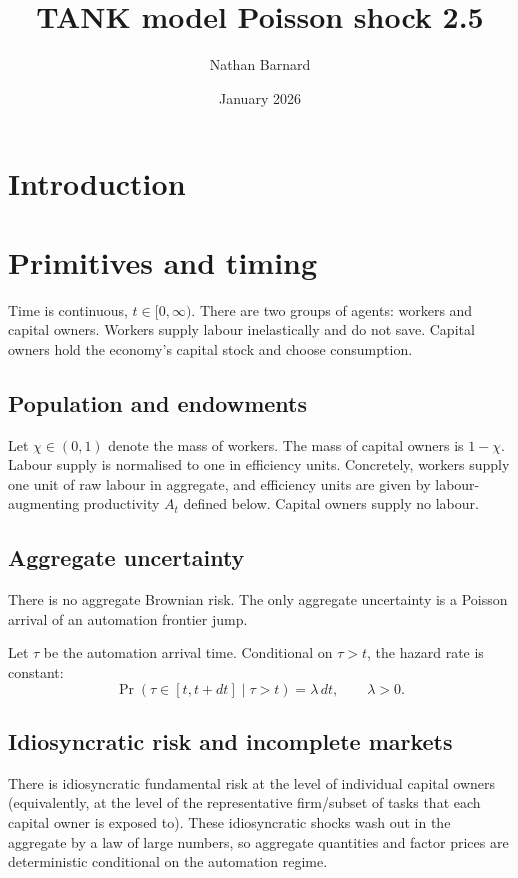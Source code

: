 \documentclass{article}
\title{TANK model Poisson shock 2.5}
\author{Nathan Barnard}
\date{January 2026}
\begin{document}
\maketitle

\section{Introduction}

\section{Primitives and timing}

Time is continuous, $t \in [0,\infty)$. There are two groups of agents: workers and capital owners. Workers supply labour inelastically and do not save. Capital owners hold the economy's capital stock and choose consumption.

\subsection{Population and endowments}

Let $\chi \in (0,1)$ denote the mass of workers. The mass of capital owners is $1-\chi$.
Labour supply is normalised to one in efficiency units. Concretely, workers supply one unit of raw labour in aggregate, and efficiency units are given by labour-augmenting productivity $A_t$ defined below. Capital owners supply no labour.

\subsection{Aggregate uncertainty}

There is no aggregate Brownian risk. The only aggregate uncertainty is a Poisson arrival of an automation frontier jump.

Let $\tau$ be the automation arrival time. Conditional on $\tau>t$, the hazard rate is constant:
$$
\Pr(\tau \in [t,t+dt] \mid \tau>t) = \lambda\,dt,
\qquad \lambda>0.
$$

\subsection{Idiosyncratic risk and incomplete markets}

There is idiosyncratic fundamental risk at the level of individual capital owners (equivalently, at the level of the representative firm/subset of tasks that each capital owner is exposed to). These idiosyncratic shocks wash out in the aggregate by a law of large numbers, so aggregate quantities and factor prices are deterministic conditional on the automation regime.
\end{document}
